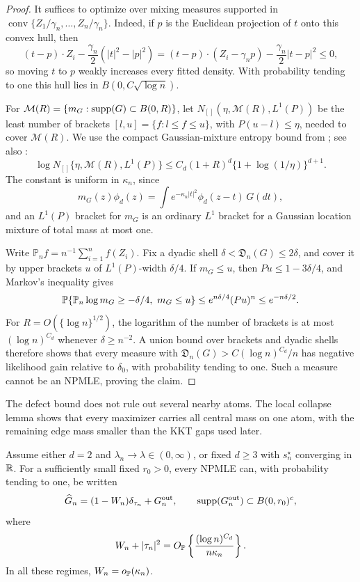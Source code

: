 \begin{proof}
It suffices to optimize over mixing measures supported in
\(\operatorname{conv}\{Z_1/\gamma_n,\ldots,Z_n/\gamma_n\}\). Indeed, if
\(p\) is the Euclidean projection of \(t\) onto this convex hull, then
\[
 (t-p)\cdot Z_i-\frac{\gamma_n}{2}(|t|^2-|p|^2)
 =(t-p)\cdot(Z_i-\gamma_np)-\frac{\gamma_n}{2}|t-p|^2\le0,
\]
so moving \(t\) to \(p\) weakly increases every fitted density. With
probability tending to one this hull lies in
\(B(0,C\sqrt{\log n})\).

For \(\mathcal M(R)=\{m_G:\operatorname{supp}(G)\subset B(0,R)\}\), let
\(N_{[]}(\eta,\mathcal M(R),L^1(P))\) be the least number of brackets
\([l,u]=\{f:l\le f\le u\}\), with \(P(u-l)\le\eta\), needed to cover
\(\mathcal M(R)\). We use the compact Gaussian-mixture entropy bound from
\cite[Section~2]{supportDivergenceCompanion}; see also
\cite[Section~3]{ghosal2001entropies}:
\begin{equation}
\label{eq:support-coarse-entropy}
 \log N_{[]}\{\eta,\mathcal M(R),L^1(P)\}
 \le C_d(1+R)^d\{1+\log(1/\eta)\}^{d+1}.
\end{equation}
The constant is uniform in \(\kappa_n\), since
\[
    m_G(z)\phi_d(z)
    =\int e^{-\kappa_n|t|^2}\phi_d(z-t)\,G(dt),
\]
and an \(L^1(P)\) bracket for \(m_G\) is an ordinary \(L^1\) bracket for
a Gaussian location mixture of total mass at most one.

Write \(\mathbb P_nf=n^{-1}\sum_{i=1}^nf(Z_i)\). Fix a dyadic shell
\(\delta<\mathfrak D_n(G)\le2\delta\), and cover it by upper
brackets \(u\) of \(L^1(P)\)-width \(\delta/4\). If \(m_G\le u\), then
\(Pu\le1-3\delta/4\), and Markov's inequality gives
\[
 \mathbb P\{\mathbb P_n\log m_G\ge-\delta/4,\ m_G\le u\}
 \le e^{n\delta/4}(Pu)^n\le e^{-n\delta/2}.
\]
For \(R=O(\{\log n\}^{1/2})\), the logarithm of the number of brackets is
at most \((\log n)^{C_d}\) whenever \(\delta\ge n^{-2}\). A union bound over
brackets and dyadic shells therefore shows that every measure with
\(\mathfrak D_n(G)>C(\log n)^{C_d}/n\) has negative likelihood gain relative to
\(\delta_0\), with probability tending to one. Such a measure cannot be an
NPMLE, proving the claim.
\end{proof}

The defect bound does not rule out several nearby atoms. The local collapse
lemma shows that every maximizer carries all central mass on one atom, with
the remaining edge mass smaller than the KKT gaps used later.
\begin{lemma}
\label{lem:support-fixed-core-collapse}
Assume either \(d=2\) and \(\lambda_n\to\lambda\in(0,\infty)\), or fixed
\(d\ge3\) with \(s_n^\star\) converging in \(\mathbb R\). For a
sufficiently small fixed $r_0>0$, every NPMLE can, with
probability tending to one, be written
\begin{equation}
\label{eq:support-central-decomposition}
    \widehat G_n=(1-W_n)\delta_{\tau_n}+G_n^{\rm out},
    \qquad
    \operatorname{supp}(G_n^{\rm out})\subset B(0,r_0)^c,
\end{equation}
where
\[
    W_n+|\tau_n|^2
    =O_{\mathbb P}\left\{\frac{(\log n)^{C_d}}{n\kappa_n}\right\}.
\]
In all these regimes, \(W_n=o_{\mathbb P}(\kappa_n)\).
\end{lemma}


